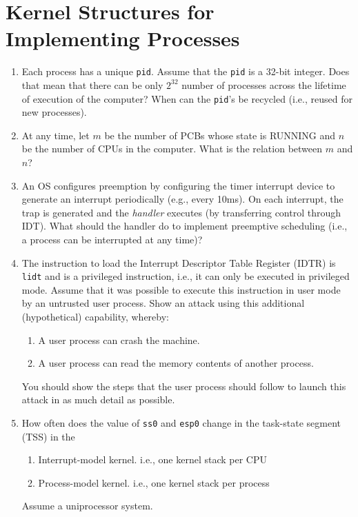 \section{Kernel Structures for Implementing Processes}
\begin{enumerate}
\item Each process has a unique {\tt pid}. Assume that the {\tt pid} is a 32-bit integer.
Does that mean that there can be only $2^{32}$ number of processes across the lifetime
of execution of the computer? When can the {\tt pid}'s be recycled (i.e., reused for new
processes).
\item At any time, let $m$ be the number of PCBs whose state is RUNNING and $n$ be the
number of CPUs in the computer. What is the relation between $m$ and $n$?
\item An OS configures preemption by configuring the timer interrupt device to generate
an interrupt periodically (e.g., every 10ms). On each interrupt, the trap is generated
and the {\em handler} executes (by transferring control through IDT). What should the
handler do to implement preemptive scheduling (i.e., a process can be interrupted
at any time)?
\item The instruction to load the Interrupt Descriptor Table
Register (IDTR) is {\tt lidt} and is a privileged instruction, i.e., it can
only be executed in privileged mode. Assume that it was possible
to execute this instruction in user mode by an untrusted
user process. Show an attack using this additional (hypothetical)
capability, whereby:
\begin{enumerate}
\item A user process can crash the machine.
\item A user process can read the memory contents of another
process.
\end{enumerate}
You should show the steps that the user process should follow
to launch this attack in as much detail as possible.
\item How often does the value of {\tt ss0} and {\tt esp0} change in the
task-state segment (TSS) in the
\begin{enumerate}
\item Interrupt-model kernel. i.e., one kernel stack per CPU
\item Process-model kernel. i.e., one kernel stack per process
\end{enumerate}
Assume a uniprocessor system.
\end{enumerate}

